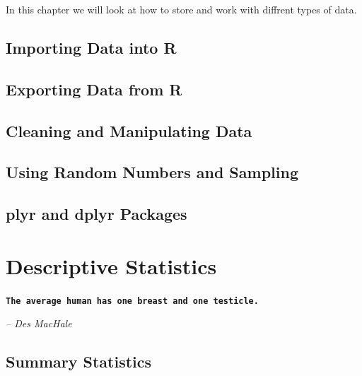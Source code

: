 \documentclass[10pt, letterpaper, twoside]{memoir}\usepackage{knitr}
\newcommand{\chapterendsymbol}{
    \vspace{24pt}
    \Huge
    \hrulefill \hspace{0.1in} \hspace{0.1in} \hrulefill
    \normalsize
    }
\begin{document}
\vspace{12pt}

In this chapter we will look at how to store and work with diffrent types of data.


\section{Importing Data into R}


\section{Exporting Data from R}

\section{Cleaning and Manipulating Data}


\section{Using Random Numbers and Sampling}


\section{plyr and dplyr Packages}

\chapterendsymbol





\chapter{Descriptive Statistics}

\begin{flushright}

\textbf{\texttt{The average human has one breast and one testicle.}}

\emph{-- Des MacHale}

\end{flushright}

\vspace{12pt}


\section{Summary Statistics}


\chapterendsymbol
\end{document}
